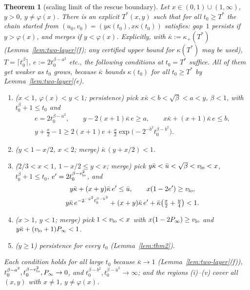 \documentclass[11pt]{article}
\newtheorem{theorem}{Theorem}[section]
\theoremstyle{definition}
\theoremstyle{remark}
\begin{document}
\begin{theorem}[scaling limit of the rescue boundary]\label{thm:B2}
Let $x\in(0,1)\cup(1,\infty)$, $y>0$, $y\ne\varphi(x)$. There is an explicit $T^*(x,y)$ such that for all
$t_0\ge T^*$ the chain started from $(u_0,v_0)=(y\kappa(t_0),x\kappa(t_0))$ satisfies: gap~$1$ persists if
$y>\varphi(x)$, and merges if $y<\varphi(x)$. Explicitly, with $\bar\kappa:=\kappa_+(T^*)$ (Lemma~\ref{lem:two-layer}(f);
any certified upper bound for $\kappa(T^*)$ may be used), $T=\lceil t_0^\beta\rceil$, $e:=2t_0^{\beta-a^2}$ etc.,
the following conditions at $t_0=T^*$ suffice. All of them get weaker as $t_0$ grows, because $\bar\kappa$ bounds $\kappa(t_0)$ for all
$t_0\ge T^*$ by Lemma~\ref{lem:two-layer}(e).
\begin{enumerate}[label=(\roman*)]
\item ($x<1$, $\varphi(x)<y<1$; persistence) pick $x\bar\kappa<b<\sqrt\beta<a<y$, $\beta<1$, with $t_0^\beta+1\le t_0$ and
\begin{gather*}
e=2t_0^{\beta-a^2},\qquad y-2(x+1)\bar\kappa\,e\ge a,\qquad x\bar\kappa+(x+1)\bar\kappa\,e\le b,\\
y+\tfrac x2-1\ge2(x+1)e+\tfrac x2\exp\!\big(-2^{-b^2}t_0^{\beta-b^2}\big).
\end{gather*}
\item ($y<1-x/2$, $x<2$; merge) $\bar\kappa\,(y+x/2)<1$.
\item ($2/3<x<1$, $1-x/2\le y<x$; merge) pick $y\bar\kappa<\bar u<\sqrt\beta<v_{\rm lo}<x$, $t_0^\beta+1\le t_0$, $e'=2t_0^{\beta-v_{\rm lo}^2}$, and
\begin{gather*}
y\bar\kappa+(x+y)\bar\kappa\,e'\le\bar u,\qquad x(1-2e')\ge v_{\rm lo},\\
y\bar\kappa\,e^{-2^{-\bar u^2}t_0^{\beta-\bar u^2}}+(x+y)\bar\kappa\,e'+\bar\kappa\big(\tfrac x2+\tfrac y4\big)<1 .
\end{gather*}
\item ($x>1$, $y<1$; merge) pick $1<v_{\rm lo}<x$ with $x(1-2P_\infty)\ge v_{\rm lo}$ and $y\bar\kappa+(v_{\rm lo}+1)P_\infty<1$.
\item ($y\ge1$) persistence for every $t_0$ (Lemma~\ref{lem:thm2}).
\end{enumerate}
Each condition holds for all large $t_0$ because $\bar\kappa\to1$ (Lemma~\ref{lem:two-layer}(f)),
$t_0^{\beta-a^2},t_0^{\beta-v_{\rm lo}^2},P_\infty\to0$, and $t_0^{\beta-b^2},t_0^{\beta-\bar u^2}\to\infty$; and the
regions (i)--(v) cover all $(x,y)$ with $x\ne1$, $y\ne\varphi(x)$.
\end{theorem}
\end{document}
